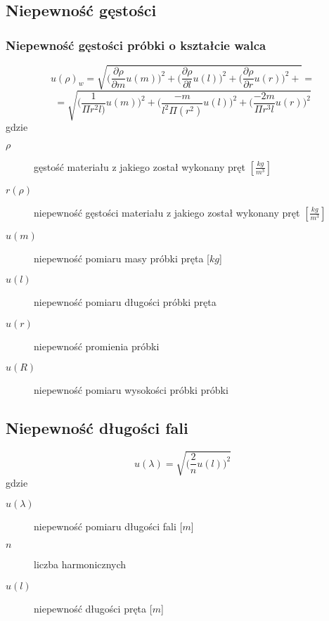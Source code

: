 \documentclass[a4paper,11pt]{article}
\begin{document}
\subsection{Niepewność gęstości}
\subsubsection{Niepewność gęstości próbki o kształcie walca}  
	$$ u(\rho)_{w}=\sqrt{\bigg(\frac{\partial \rho}{\partial m}u(m)\bigg)^2+\bigg(\frac{\partial \rho}{\partial l}u(l)\bigg)^2+\bigg(\frac{\partial \rho}{\partial r}u(r)\bigg)^2+} = $$ 
   $$ = \sqrt{\bigg(\frac{1}{\Pi r^2 l)}u(m)\bigg)^2+\bigg(\frac{-m}{l^2 \Pi(r^2)}u(l)\bigg)^2+\bigg(\frac{-2m}{\Pi r^3 l}u(r)\bigg)^2}$$
	gdzie 
    \begin{description}
    \item [$\rho$] gęstość materiału z jakiego został wykonany pręt $\left[\frac{kg}{m^3}\right]$
    
    \item [$r(\rho)$] niepewność gęstości materiału z jakiego został wykonany pręt $\left[\frac{kg}{m^3}\right]$
  
    \item [$u(m)$] niepewność pomiaru masy próbki pręta [$kg$]
  
     \item [$u(l)$] niepewność pomiaru długości próbki pręta
 
     \item [$u(r)$] niepewność promienia próbki

     \item [$u(R)$] niepewność pomiaru wysokości próbki próbki
    \end{description}
    
	\subsection{Niepewność długości fali}
	$$ u(\lambda)=\sqrt{\bigg(\frac{2}{n}u(l)\bigg)^2}$$
	gdzie
    \begin{description}
    \item [$u(\lambda)$] niepewność pomiaru długości fali [$m$]
    \item [$n$] liczba harmonicznych
    \item [$u(l)$] niepewność długości pręta [$m$]
    \end{description}
    
\end{document}
